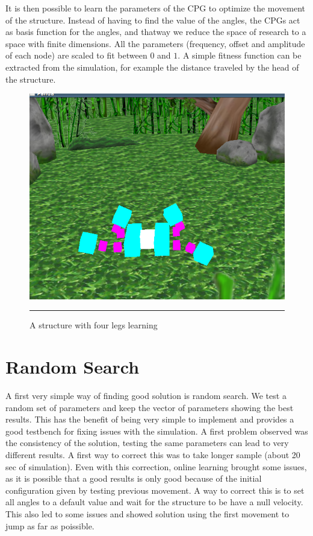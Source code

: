It is then possible to learn the parameters of the CPG to optimize the movement of the structure. Instead of having to find the value of the angles, the CPGs act as basis function for the angles, and thatway we reduce the space of research to a space with finite dimensions. All the parameters (frequency, offset and amplitude of each node) are scaled to fit between $0$ and $1$. A simple fitness function can be extracted from the simulation, for example the distance traveled by the head of the structure. 
\begin{figure}[htbp]
    \centering
    \includegraphics[scale=0.5]{Figures/four_legged.png}
    \rule{35em}{0.5pt}
    \caption[A structure with four legs learning]{A structure with four legs learning}
    \label{fig:four_legged}
\end{figure}

\section{Random Search}

A first very simple way of finding good solution is random search. We test a random set of parameters and keep the vector of parameters showing the best results. This has the benefit of being very simple to implement and provides a good testbench for fixing issues with the simulation. A first problem observed was the consistency of the solution, testing the same parameters can lead to very different results. A first way to correct this was to take longer sample (about 20 sec of simulation). Even with this correction, online learning brought some issues, as it is possible that a good results is only good because of the initial configuration given by testing previous movement. A way to correct this is to set all angles to a default value and wait for the structure to be have a null velocity. This also led to some issues and showed solution using the first movement to jump as far as poissible. 


